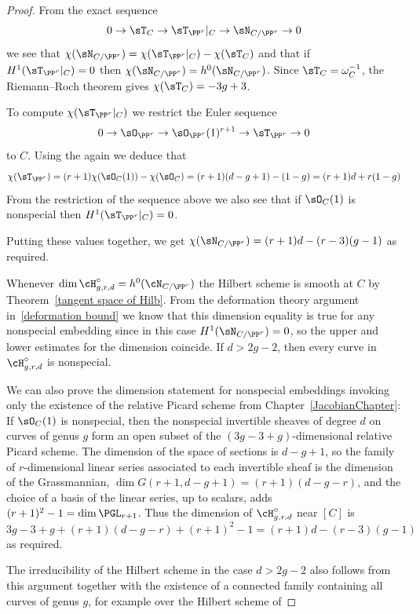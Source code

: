 \begin{proof}
From the exact sequence
$$
0 \to \sT_C \to \sT_{\PP^r}|_C \to \sN_{C/\PP^r} \to 0
$$
we see that $\chi(\sN_{C/\PP^r}) = \chi(\sT_{\PP^r}|_C) - \chi(\sT_C)$
and that if $H^1( \sT_{\PP^r}|_C) = 0$ then $\chi(\sN_{C/\PP^r}) =
h^0(\sN_{C/\PP^r})$.
Since $\sT_C = \omega_C^{-1}$, the Riemann--Roch theorem gives $\chi(\sT_C)
= -3g+3$.

To compute $\chi(\sT_{\PP^r}|_C)$ we restrict the Euler sequence
$$
0\to \sO_{\PP^r} \to \sO_{\PP^r}(1)^{r+1} \to \sT_{\PP^r} \to 0
$$
to $C$.
Using the 
%
again we deduce that
$$
\chi( \sT_{\PP^r} ) = (r+1)\chi(\sO_C(1)) - \chi(\sO_C) = (r+1)(d-g+1) -
(1-g) = (r+1)d + r(1-g)
$$
From the restriction of the sequence above we also see that
if $\sO_C(1)$ is nonspecial then $H^1(\sT_{\PP^r}|_C) = 0$.

Putting these values together, we get
$
\chi(\sN_{C/\PP^r}) = (r+1)d - (r-3)(g-1)
$
as required.

Whenever $\dim \cH^\circ_{g,r,d} = h^{0}(\cN_{C/\PP^{r}}) $ the Hilbert
scheme is smooth at $C$ by
Theorem~\ref{tangent space of Hilb}.
From the deformation theory argument
in~\ref{deformation bound} we know that this dimension equality is true
for any
nonspecial embedding since in this case
$H^1(\sN_{C/\PP^r}) = 0$, so the upper and lower estimates for the
dimension
coincide. If $d>2g-2$, then every curve in $\cH^\circ_{g,r,d}$ is
nonspecial.

We can also prove the dimension statement for nonspecial embeddings
invoking only the existence of the relative Picard scheme from
Chapter~\ref{JacobianChapter}:
If $\sO_C(1)$ is nonspecial, then the
nonspecial invertible sheaves of degree $d$ on curves of genus $g$
 form an open subset of the $(3g-3+ g)$-dimensional relative Picard
 scheme. The dimension
 of the space of sections is $d-g+1$, so the family of $r$-dimensional
 linear series associated to
 each invertible sheaf is the dimension of the Grassmannian, $\dim G(r+1,
 d-g+1) = (r+1)(d-g-r)$,
 and the choice of a basis of the linear series, up to scalars, adds
 $(r+1)^2-1 = \dim \PGL_{r+1}$.
 Thus the dimension of  $\cH^\circ_{g,r,d}$ near $[C]$ is
$$
3g-3+ g + (r+1)(d-g-r) + (r+1)^2-1 = (r+1)d - (r-3)(g-1)
$$
as required.

The irreducibility of the Hilbert scheme in the case $d>2g-2$ also
follows from this argument
together with the existence of a connected family containing all curves
of genus $g$, for example over the
Hilbert scheme of 
%
\end{proof}


